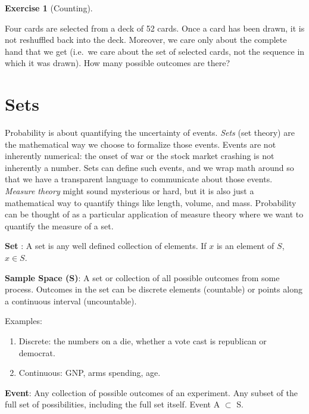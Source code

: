 \documentclass[
  letterpaper,
]{book}
\providecommand{\tightlist}{%
  \setlength{\itemsep}{0pt}\setlength{\parskip}{0pt}}\usepackage{longtable,booktabs,array}
\theoremstyle{definition}
\theoremstyle{definition}
\theoremstyle{plain}
\theoremstyle{definition}
\newtheorem{exercise}{Exercise}[chapter]
\theoremstyle{plain}
\theoremstyle{plain}
\theoremstyle{remark}
\begin{document}
\leavevmode{}%
\begin{exercise}[Counting]\label{exr-counting1}

Four cards are selected from a deck of 52 cards. Once a card has been
drawn, it is not reshuffled back into the deck. Moreover, we care only
about the complete hand that we get (i.e.~we care about the set of
selected cards, not the sequence in which it was drawn). How many
possible outcomes are there?

\end{exercise}

\hypertarget{setoper}{%
\section{Sets}\label{setoper}}

Probability is about quantifying the uncertainty of events. \emph{Sets}
(set theory) are the mathematical way we choose to formalize those
events. Events are not inherently numerical: the onset of war or the
stock market crashing is not inherently a number. Sets can define such
events, and we wrap math around so that we have a transparent language
to communicate about those events. \emph{Measure theory} might sound
mysterious or hard, but it is also just a mathematical way to quantify
things like length, volume, and mass. Probability can be thought of as a
particular application of measure theory where we want to quantify the
measure of a set.

\textbf{Set} : A set is any well defined collection of elements. If
\(x\) is an element of \(S\), \(x \in S\).

\textbf{Sample Space (S)}: A set or collection of all possible outcomes
from some process. Outcomes in the set can be discrete elements
(countable) or points along a continuous interval (uncountable).

Examples:

\begin{enumerate}
\def\labelenumi{\arabic{enumi}.}
\tightlist
\item
  Discrete: the numbers on a die, whether a vote cast is republican or
  democrat.
\item
  Continuous: GNP, arms spending, age.
\end{enumerate}

\textbf{Event}: Any collection of possible outcomes of an experiment.
Any subset of the full set of possibilities, including the full set
itself. Event A \(\subset\) S.
\end{document}
